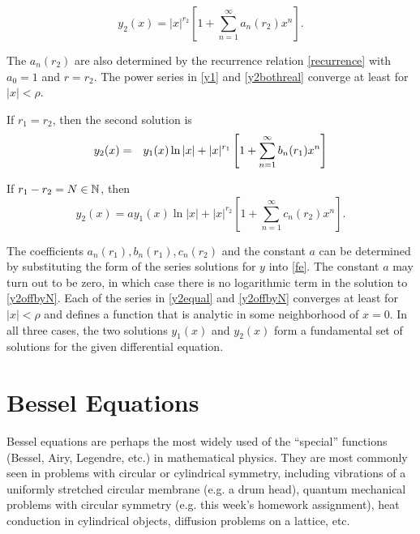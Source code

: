 \documentclass[12pt]{article}
\begin{document}
\begin{equation}
  \label{y2bothreal}
  y_2(x) = |x|^{r_2}\left [ 1 + \sum_{n=1}^{\infty}a_n(r_2)x^n \right ].
\end{equation}

The $a_n(r_2)$ are also determined by the recurrence relation
\eqref{recurrence} with $a_0=1$ and $r=r_2$. The power series in
\eqref{y1} and \eqref{y2bothreal} converge at least for $|x|<\rho$.

If $r_1=r_2$, then the second solution is
\begin{eqnarray}
  \label{y2equal}
  y_2(x) &=& y_1(x)\ln|x|+|x|^{r_1}\left [ 1 + \sum_{n=1}^{\infty}b_n(r_1)x^n \right ] \notag\\
\end{eqnarray}

If $r_1-r_2 = N \in \mathbb{N}$, then
\begin{equation}
  \label{y2offbyN}
  y_2(x) = ay_1(x)\ln|x|+|x|^{r_2}\left [ 1 + \sum_{n=1}^{\infty}c_n(r_2)x^n \right ].
\end{equation}

The coefficients $a_n(r_1), b_n(r_1), c_n(r_2)$ and the constant $a$
can be determined by substituting the form of the series solutions for
$y$ into \eqref{fe}. The constant $a$ may turn out to be zero, in
which case there is no logarithmic term in the solution to
\eqref{y2offbyN}. Each of the series in \eqref{y2equal} and
\eqref{y2offbyN} converges at least for $|x|<\rho$ and defines a
function that is analytic in some neighborhood of $x=0$.  In all three
cases, the two solutions $y_1(x)$ and $y_2(x)$ form a fundamental set
of solutions for the given differential equation.

\section{Bessel Equations}

Bessel equations are perhaps the most widely used of the ``special''
functions (Bessel, Airy, Legendre, etc.) in mathematical physics. They
are most commonly seen in problems with circular or cylindrical
symmetry, including vibrations of a uniformly stretched circular
membrane (e.g. a drum head), quantum mechanical problems with circular
symmetry (e.g. this week's homework assignment), heat conduction in
cylindrical objects, diffusion problems on a lattice, etc.
\end{document}
